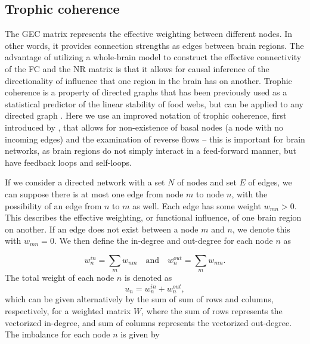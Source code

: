 \subsection{Trophic coherence} The GEC matrix represents the
effective weighting between different nodes. In other words, it provides
connection strengths as edges between brain regions. The advantage of
utilizing a whole-brain model to construct the effective connectivity of
the FC and the NR matrix is that it allows for causal inference of the
directionality of influence that one region in the brain has on another.
Trophic coherence is a property of directed graphs that has been
previously used as a statistical predictor of the linear stability of
food webs, but can be applied to any directed graph \parencite{Johnson2014, MacKay2020}. Here we use an improved notation of trophic
coherence, first introduced by \textcite{MacKay2020}, that allows for non-existence of basal nodes (a node with no
incoming edges) and the examination of reverse flows -- this is
important for brain networks, as brain regions do not simply interact in
a feed-forward manner, but have feedback loops and self-loops.

If we consider a directed network with a set \(N\) of nodes and set
\(E\) of edges, we can suppose there is at most one edge from node \(m\)
to node \(n\), with the possibility of an edge from \(n\) to \(m\) as
well. Each edge has some weight \(w_{mn}>0\). This describes the
effective weighting, or functional influence, of one brain region on
another. If an edge does not exist between a node \(m\) and \(n\), we
denote this with \(w_{mn}=0\). We then define the in-degree and
out-degree for each node \(n\) as


\begin{equation}
w_n^{in}=\sum_{m}{w_{nm}} \quad\mathrm{and}\quad w_n^{out}=\sum_{m}{w_{mn}}.
\end{equation}
 The total weight of each node \(n\) is denoted as 
\begin{equation}
u_n=w_n^{in}+w_n^{out},
\end{equation}
 which can be given alternatively by the sum of sum of rows and
columns, respectively, for a weighted matrix \(W\), where the sum of
rows represents the vectorized in-degree, and sum of columns represents
the vectorized out-degree. The imbalance for each node \(n\) is given by

